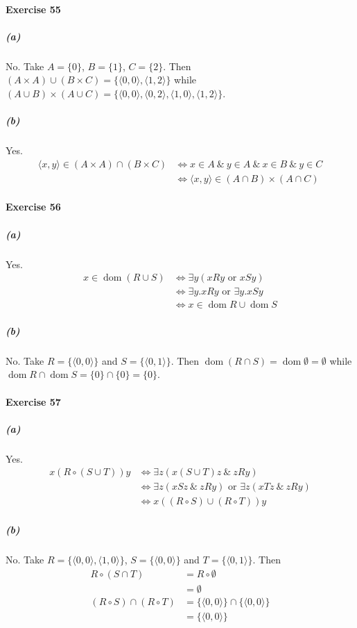 \documentclass{report}
\newcommand{\dom}{\ensuremath{\operatorname{dom}}}
\begin{document}
    \paragraph{Exercise 55}
    \subparagraph{(a)}
    No. Take $A = \{0\}$, $B = \{1\}$, $C = \{2\}$. Then $(A \times A) \cup (B \times C) = \{ \langle 0,0
    \rangle, \langle 1,2 \rangle \}$ while $(A \cup B) \times (A \cup C) = \{
        \langle 0,0 \rangle, \langle 0,2 \rangle, \langle 1,0 \rangle, \langle 1,2 \rangle \}$.

    \subparagraph{(b)}
    Yes.
    \begin{align*}
        \langle x,y \rangle \in (A \times A) \cap (B \times C)
        & \Leftrightarrow x \in A\ \&\ y \in A\ \&\ x \in B\ \&\ y \in C \\
        & \Leftrightarrow \langle x,y \rangle \in (A \cap B) \times (A \cap C)
    \end{align*}

    \paragraph{Exercise 56}
    \subparagraph{(a)}
    Yes.
    \begin{align*}
        x \in \dom (R \cup S) & \Leftrightarrow \exists y (xRy \text{ or } xSy) \\
        & \Leftrightarrow \exists y.xRy \text{ or } \exists y.xSy \\
        & \Leftrightarrow x \in \dom R \cup \dom S
    \end{align*}

    \subparagraph{(b)}
    No. Take $R = \{ \langle 0,0 \rangle \}$ and $S = \{ \langle 0,1 \rangle \}$. Then $\dom (R \cap S)
    = \dom \emptyset = \emptyset$ while $\dom R \cap \dom S = \{ 0 \} \cap \{ 0 \} = \{ 0 \}$.

    \paragraph{Exercise 57}
    \subparagraph{(a)}
    Yes.
    \begin{align*}
        x(R\circ(S \cup T))y & \Leftrightarrow \exists z (x(S \cup T)z \ \&\ zRy) \\
        & \Leftrightarrow \exists z (xSz \ \&\ zRy) \text{ or } \exists z(xTz\ \&\ zRy) \\
        & \Leftrightarrow x((R\circ S)\cup(R\circ T)) y
    \end{align*}

    \subparagraph{(b)}
    No. Take $R = \{ \langle 0,0 \rangle, \langle 1,0 \rangle \}$, $S = \{ \langle 0,0 \rangle \}$
    and $T = \{ \langle 0,1 \rangle \}$. Then
    \begin{align*}
        R \circ (S \cap T) & = R \circ \emptyset \\
        & = \emptyset \\
        (R \circ S) \cap (R \circ T) & = \{ \langle 0,0 \rangle \} \cap \{ \langle 0,0 \rangle \} \\
        & = \{ \langle 0,0 \rangle \}
    \end{align*}
\end{document}
